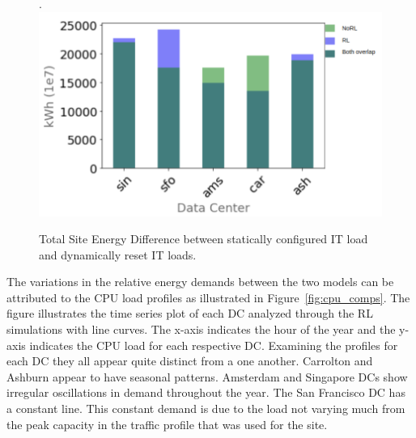 \begin{figure}.
  \centering
  \includegraphics[scale=0.275]{img/cpu_comps_3legend.png}
  \caption{Total Site Energy Difference between statically configured IT load and dynamically reset IT loads.}
  \label{fig:total_energy_comp}
  \end{figure}

The variations in the relative energy demands between the two models can be attributed to the CPU load profiles as illustrated in Figure~\ref{fig:cpu_comps}. The figure illustrates the time series plot of each DC analyzed through the RL simulations with line curves. The x-axis indicates the hour of the year and the y-axis indicates the CPU load for each respective DC. Examining the profiles for each DC they all appear quite distinct from a one another. Carrolton and Ashburn appear to have   seasonal patterns. Amsterdam and Singapore DCs show irregular oscillations in demand throughout the year. The San Francisco DC has a constant line. This constant demand is due to the load not varying much from the peak capacity in the traffic profile that was used for the site. 



